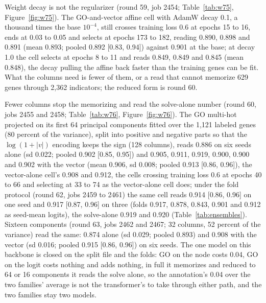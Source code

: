 Weight decay is not the regularizer (round 59, job 2454; Table~\ref{tab:w75},
Figure~\ref{fig:w75}). The GO-and-vector affine cell with AdamW decay 0.1, a
thousand times the base $10^{-4}$, still crosses training loss 0.6 at epochs 15 to
16, ends at 0.03 to 0.05 and selects at epochs 173 to 182, reading 0.890, 0.898 and
0.891 (mean 0.893; pooled 0.892 [0.83, 0.94]) against 0.901 at the base; at decay 1.0
the cell selects at epochs 8 to 11 and reads 0.849, 0.849 and 0.845 (mean 0.848),
the decay pulling the affine back faster than the training genes can be fit. What the
columns need is fewer of them, or a read that cannot memorize 629 genes through
2,362 indicators; the reduced form is round 60.




Fewer columns stop the memorizing and read the solve-alone number (round 60, jobs
2455 and 2458; Table~\ref{tab:w76}, Figure~\ref{fig:w76}). The GO multi-hot
projected on its first 64 principal components fitted over the 1,121 labeled genes
(80 percent of the variance), split into positive and negative parts so that the
$\log(1 + |v|)$ encoding keeps the sign (128 columns), reads 0.886 on six seeds
alone (sd 0.022; pooled 0.902 [0.85, 0.95]) and 0.905, 0.911, 0.919, 0.900, 0.900 and
0.902 with the vector (mean 0.906, sd 0.008; pooled 0.913 [0.86, 0.96]), the
vector-alone cell's 0.908 and 0.912, the cells crossing training loss 0.6 at epochs
40 to 66 and selecting at 33 to 74 as the vector-alone cell does; under the fold
protocol (round 62, jobs 2459 to 2461) the same cell reads 0.914 [0.86, 0.96] on
one seed and 0.917 [0.87, 0.96] on three (folds 0.917, 0.878, 0.843, 0.901 and
0.912 as seed-mean logits), the solve-alone 0.919 and 0.920
(Table~\ref{tab:ensembles}). Sixteen components (round 63, jobs 2462 and 2467; 32
columns, 52 percent of the variance) read the same: 0.874 alone (sd 0.029; pooled
0.893) and 0.908 with the vector (sd 0.016; pooled 0.915 [0.86, 0.96]) on six seeds.
The one model on this backbone is closed on the split file and the folds: GO on the
node costs 0.04, GO on the logit costs nothing and adds nothing, in full it memorizes
and reduced to 64 or 16 components it reads the solve alone, so the annotation's 0.04
over the two families' average is not the transformer's to take through either path,
and the two families stay two models.

